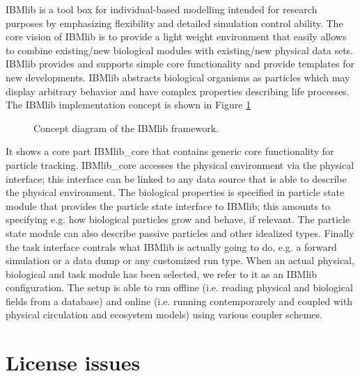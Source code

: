 IBMlib is a tool box for individual-based modelling intended for research purposes
by emphasizing flexibility and detailed simulation control ability.
The core vision of IBMlib is to provide a light weight environment
that easily allows to combine existing/new biological modules with 
existing/new physical data sets.
IBMlib provides and supports simple core functionality and provide
templates for new developments.
IBMlib abstracts biological organisms as particles which may display arbitrary 
behavior and have complex properties describing life processes.
The IBMlib implementation concept is shown in Figure \ref{IBMlib:concept}
\begin{figure}[p]   %
\begin{center}                                                  %
\end{center}                                                    %
\caption{Concept diagram of the IBMlib framework.}
\label{IBMlib:concept}
\end{figure}
It shows a core part IBMlib\_core that contains generic core functionality for
particle tracking. IBMlib\_core accesses the physical environment via the
physical interface; this interface can be linked to any data source that is
able to describe the physical environment. The biological properties is specified in 
particle state module that provides the particle state interface to IBMlib; 
this amounts to specifying e.g. how biological particles grow and behave, if relevant.
The particle state module can also describe passive particles and other 
idealized types. Finally the task interface contrals what IBMlib is actually going 
to do, e.g. a forward simulation or a data dump or any customized run type.
When an actual physical, biological 
and task module has been selected, we refer to it as an IBMlib configuration.
The setup is able to run offline (i.e. reading physical and biological fields from a database)
and online (i.e. running contemporarely and coupled with 
physical circulation and ecosystem models) using various coupler schemes.

\chapter{License issues}

